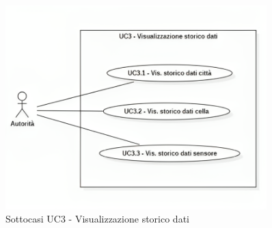 \documentclass{article}
\begin{document}

\begin{figure}[H]
    \centering
    \includegraphics[width=0.9\textwidth]{Images/uc3_Subcase.png}
    \caption{Sottocasi UC3 - Visualizzazione storico dati }
    \label{fig:UC3_sub}
\end{figure}
\end{document}

